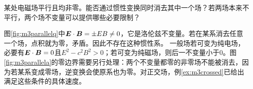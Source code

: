 \begin{exercise}\label{ex:m3parallelfields}
某处电磁场平行且均非零。能否通过惯性变换同时消去其中一个场？若两场本来不平行，两个场不变量可以提供哪些必要限制？
\end{exercise}
\begin{solution}
图\ref{fig:m3parallelq}中$\bm{E}\cdot\bm{B}=\pm EB\ne0$，它是洛伦兹不变量。若在某系消去任意一个场，点积就为零，矛盾。因此不存在这种惯性系。
一般场若可变为纯电场，必要有$\bm{E}\cdot\bm{B}=0$且$E^2-c^2B^2>0$；若可变为纯磁场，则后一不变量小于0。图\ref{fig:m3parallela}的零边界需要另行处理：两个不变量都零的非零场不能被消去，因为若某系变成零场，逆变换会使原系也为零。对正交场，例\ref{ex:m3crossed}已给出满足这些条件的具体速度。
\end{solution}
